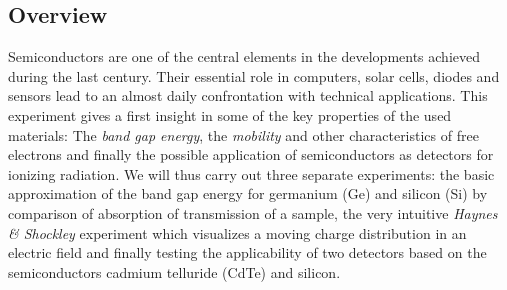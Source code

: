 \subsection{Overview}

Semiconductors are one of the central elements in the developments 
achieved during the last century. Their essential role in computers, 
solar cells, diodes and sensors lead to an almost daily confrontation 
with technical applications. This experiment gives a first insight 
in some of the key properties of the used materials: 
The \emph{band gap energy}, the \emph{mobility} and other characteristics 
of free electrons and finally the possible application 
of semiconductors as detectors for ionizing radiation. 
We will thus carry out three separate experiments: the basic approximation 
of the band gap energy for germanium (Ge) and silicon (Si) by comparison 
of absorption of transmission of a sample, the very intuitive 
\emph{Haynes \& Shockley} experiment 
which visualizes a moving charge distribution in an electric field 
and finally testing the applicability of two detectors based on the 
semiconductors cadmium telluride (CdTe) and silicon.
